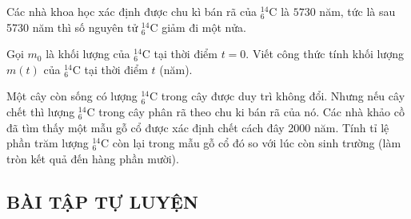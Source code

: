  \begin{vd}%
	Các nhà khoa học xác định được chu kì bán rã của ${ }_6^{14} \mathrm{C}$ là $5730$ năm, tức là sau 5730 năm thì số nguyên tử ${ }_6^{14} \mathrm{C}$ giảm đi một nửa.
	\begin{listEX}[1]
		\item Gọi $m_0$ là khối lượng của ${ }_6^{14} \mathrm{C}$ tại thời điểm $t=0$. Viết công thức tính khối lượng $m(t)$ của ${ }_6^{14} \mathrm{C}$ tại thời điểm $t$ (năm).
		\item Một cây còn sống có lượng ${ }_6^{14} \mathrm{C}$ trong cây được duy trì không đổi. Nhưng nếu cây chết thì lượng ${ }_6^{14} \mathrm{C}$ trong cây phân rã theo chu ki bán rã của nó. Các nhà khảo cồ đã tìm thấy một mẫu gỗ cổ được xác định chết cách đây 2000 năm. Tính tỉ lệ phần trăm lượng ${ }_6^{14} \mathrm{C}$ còn lại trong mẫu gỗ cổ đó so với lúc còn sinh trường (làm tròn kết quả đến hàng phần mười).
	\end{listEX}
\end{vd} 

\subsection{BÀI TẬP TỰ LUYỆN}

